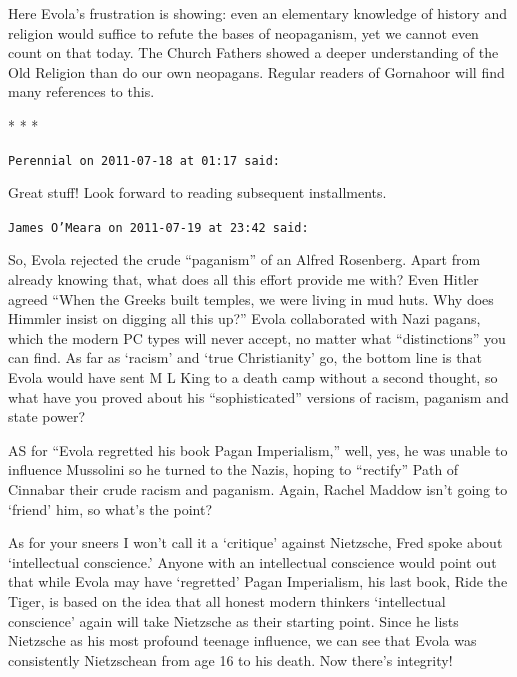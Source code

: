 \begin{quotex}
Here Evola's frustration is showing: even an elementary knowledge of history and religion would suffice to refute the bases of neopaganism, yet we cannot even count on that today. The Church Fathers showed a deeper understanding of the Old Religion than do our own neopagans. Regular readers of Gornahoor will find many references to this.
\end{quotex}



\begin{center}* * *\end{center}

\begin{footnotesize}
\begin{sffamily}
\texttt{Perennial on 2011-07-18 at 01:17 said:}

Great stuff! Look forward to reading subsequent installments.

\hfill

\texttt{James O'Meara on 2011-07-19 at 23:42 said:}

So, Evola rejected the crude ``paganism'' of an Alfred Rosenberg. Apart from already knowing that, what does all this effort provide me with? Even Hitler agreed ``When the Greeks built temples, we were living in mud huts. Why does Himmler insist on digging all this up?'' Evola collaborated with Nazi pagans, which the modern PC types will never accept, no matter what ``distinctions'' you can find. As far as `racism' and `true Christianity' go, the bottom line is that Evola would have sent M L King to a death camp without a second thought, so what have you proved about his ``sophisticated'' versions of racism, paganism and state power?

AS for ``Evola regretted his book Pagan Imperialism,'' well, yes, he was unable to influence Mussolini so he turned to the Nazis, hoping to ``rectify'' Path of Cinnabar their crude racism and paganism. Again, Rachel Maddow isn't going to `friend' him, so what's the point?

As for your sneers I won't call it a `critique' against Nietzsche, Fred spoke about `intellectual conscience.' Anyone with an intellectual conscience would point out that while Evola may have `regretted' Pagan Imperialism, his last book, Ride the Tiger, is based on the idea that all honest modern thinkers `intellectual conscience' again will take Nietzsche as their starting point. Since he lists Nietzsche as his most profound teenage influence, we can see that Evola was consistently Nietzschean from age 16 to his death. Now there's integrity!


\end{sffamily}
\end{footnotesize}
